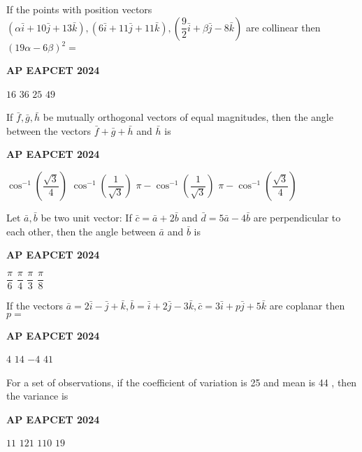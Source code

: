 \documentclass[11pt,paper=a4,answers]{exam}
\begin{document}
\begin{multicols}{2}
\begin{questions}
\question
If the points with position vectors $(\alpha \bar{i}+10 \bar{j}+13 \bar{k}),(6 \bar{i}+11 \bar{j}+11 \bar{k}),\left(\dfrac{9}{2} \bar{i}+\beta \bar{j}-8 \bar{k}\right)$ are collinear then $(19 \alpha-6 \beta)^2=$
\begin{flushright}
\small\textbf{AP EAPCET 2024}
\end{flushright}
\begin{choices}
  \choice $16$ 
  \choice $36$ 
  \choice $25$ 
  \choice $49$ 
\end{choices}



\question
If $\bar{f}, \bar{g}, \bar{h}$ be mutually orthogonal vectors of equal magnitudes, then the angle between the vectors $\bar{f}+\bar{g}+\bar{h}$ and $\bar{h}$ is
\begin{flushright}
\small\textbf{AP EAPCET 2024}
\end{flushright}
\begin{choices}
  \choice $\cos ^{-1}\left(\dfrac{\sqrt{3}}{4}\right)$
  \choice $\cos ^{-1}\left(\dfrac{1}{\sqrt{3}}\right)$
  \choice $\pi-\cos ^{-1}\left(\dfrac{1}{\sqrt{3}}\right)$
  \choice $\pi-\cos ^{-1}\left(\dfrac{\sqrt{3}}{4}\right)$
\end{choices}


\question
Let $\bar{a}, \bar{b}$ be two unit vector: If $\bar{c}=\bar{a}+2 \bar{b}$ and $\bar{d}=5 \bar{a}-4 \bar{b}$ are perpendicular to each other, then the angle between $\bar{a}$ and $\bar{b}$ is
\begin{flushright}
\small\textbf{AP EAPCET 2024}
\end{flushright}
\begin{choices}
  \choice $\dfrac{\pi}{6}$
  \choice $\dfrac{\pi}{4}$
  \choice $\dfrac{\pi}{3}$ 
  \choice $\dfrac{\pi}{8}$ 
\end{choices}

\question
If the vectors $\bar{a}=2 \bar{i}-\bar{j}+\bar{k}, \bar{b}=\bar{i}+2 \bar{j}-3 \bar{k}, \bar{c}=3 \bar{i}+p \bar{j}+5 \bar{k}$ are coplanar then $p=$
\begin{flushright}
\small\textbf{AP EAPCET 2024}
\end{flushright}
\begin{choices}
  \choice $4$ 
  \choice $14$ 
  \choice $-4$ 
  \choice $41$ 
\end{choices}



\question
For a set of observations, if the coefficient of variation is 25 and mean is 44 , then the variance is
\begin{flushright}
\small\textbf{AP EAPCET 2024}
\end{flushright}
\begin{choices}
  \choice $11$ 
  \choice $121$ 
  \choice $110$ 
  \choice $19$ 
\end{choices}



\end{questions}
\end{multicols}
\end{document}
